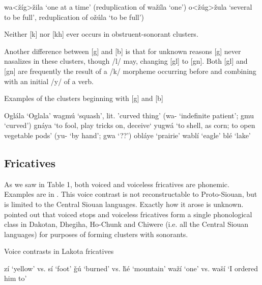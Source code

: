 \documentclass[output=paper]{LSP/langsci}
\begin{document}
\begin{exe}
\ex \begin{xlist}
\ex wa<\v{z}\'ig>\v{z}ila `one at a time' (reduplication of wa\v{z}\'ila `one')
\ex o<\v{z}\'ug>\v{z}ula `several to be full', reduplication of o\v{z}\'ula `to be full')
\end{xlist}
\end{exe}

Neither [k] nor [kh] ever occurs in obstruent-sonorant clusters. 

Another difference between [g] and [b] is that for unknown reasons [g] never nasalizes in these clusters, though /l/ may, changing [gl] to [gn]. Both [gl] and [gn] are frequently the result of a /k/ morpheme occurring before and combining with an initial /y/ of a verb.

\begin{exe}
\ex Examples of the clusters beginning with [g] and [b]
\begin{xlist}
\ex Ogl\'ala `Oglala'
\ex wagm\'u `squash', lit. 'curved thing' (wa- `indefinite patient'; gmu `curved')
\ex gn\'aya `to fool, play tricks on, deceive`
\ex yugw\'a `to shell, as corn; to open vegetable pods' (yu- `by hand'; gwa `??')
\ex obl\'aye `prairie'
\ex wabl\'i `eagle'
\ex bl\'e `lake'
\end{xlist}
\end{exe}

\subsection{Fricatives}

As we saw in Table 1, both voiced and voiceless fricatives are phonemic. Examples are in . This voice contrast is not reconstructable to Proto-Siouan, but is limited to the Central Siouan languages. Exactly how it arose is unknown. \citet{Miner1979} pointed out that voiced stops and voiceless fricatives form a single phonological class in Dakotan, Dhegiha, Ho-Chunk and Chiwere (i.e. all the Central Siouan languages) for purposes of forming clusters with sonorants.

\begin{exe}
\ex Voice contrasts in Lakota fricatives
\begin{xlist}
\ex z\'i `yellow' vs. s\'i `foot'
\ex \v{g}\'u `burned' vs. \v{h}\'e `mountain'
\ex wa\v{z}\'i `one' vs. wa\v{s}\'i `I ordered him to'
\end{xlist}
\end{exe}
\end{document}
